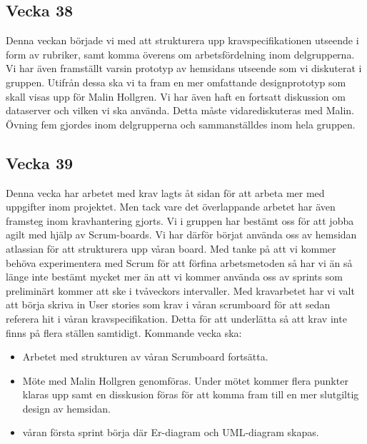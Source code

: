 \documentclass[12pt]{article}
\begin{document}
    \subsection{Vecka 38}
    Denna veckan började vi med att strukturera upp kravspecifikationen utseende i form av rubriker, samt komma överens om arbetsfördelning inom delgrupperna. Vi har även framställt varsin prototyp av hemsidans utseende som vi diskuterat i gruppen. Utifrån dessa ska vi ta fram en mer omfattande designprototyp som skall visas upp för Malin Hollgren. Vi har även haft en fortsatt diskussion om dataserver och vilken vi ska använda. Detta måste vidarediskuteras med Malin. Övning fem gjordes inom delgrupperna och sammanställdes inom hela gruppen.
    
    \subsection{Vecka 39}
    Denna vecka har arbetet med krav lagts åt sidan för att arbeta mer med uppgifter inom projektet. Men tack vare det överlappande arbetet har även framsteg inom kravhantering gjorts. Vi i gruppen har bestämt oss för att jobba agilt med hjälp av Scrum-boards. Vi har därför börjat använda oss av hemsidan atlassian för att strukturera upp våran board. Med tanke på att vi kommer behöva experimentera med Scrum för att förfina arbetsmetoden så har vi än så länge inte bestämt mycket mer än att vi kommer använda oss av sprints som preliminärt kommer att ske i tvåveckors intervaller. 
    Med kravarbetet har vi valt att börja skriva in User stories som krav i våran scrumboard för att sedan referera hit i våran kravspecifikation. Detta för att underlätta så att krav inte finns på flera ställen samtidigt.
    Kommande vecka ska: \\ 
    \begin{itemize}
        \item Arbetet med strukturen av våran Scrumboard fortsätta.
        \item Möte med Malin Hollgren genomföras. Under mötet kommer flera 
        punkter klaras upp samt en disskusion föras för att komma fram till en mer slutgiltig design av hemsidan.
        \item våran första sprint börja där Er-diagram och UML-diagram skapas.
    \end{itemize}
    
\end{document}
